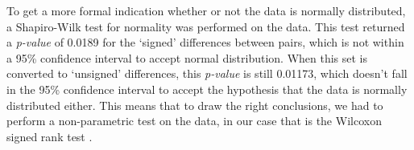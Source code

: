 To get a more formal indication whether or not the data is normally distributed, a Shapiro-Wilk test for normality \cite{doi:10.1093/biomet/52.3-4.591} was performed on the data. This test returned a \textit{p-value} of 0.0189 for the `signed' differences between pairs, which is not within a 95\% confidence interval to accept normal distribution. When this set is converted to `unsigned' differences, this \textit{p-value} is still 0.01173, which doesn't fall in the 95\% confidence interval to accept the hypothesis that the data is normally distributed either. This means that to draw the right conclusions, we had to perform a non-parametric test on the data, in our case that is the Wilcoxon signed rank test \cite{10.2307/3001968}.






